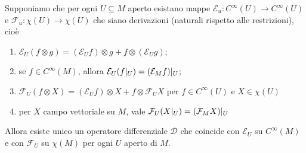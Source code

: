 \begin{theorem}
	Supponiamo che per ogni $U\subseteq M$ aperto esistano mappe $\mathcal E_u : C^\infty(U) \to C^\infty(U)$ e $\mathcal F_u : \chi(U) \to \chi(U)$ che siano derivazioni (naturali rispetto alle restrizioni), cioè
	\begin{enumerate}
		\item $\mathcal E_U(f\otimes g) = (\mathcal E_U f) \otimes g + f \otimes (\mathcal E_U g)$;
		\item se $f\in C^\infty(M)$, allora $\mathcal E_U(f|_ U) = (\mathcal E_M f)|_ U$;
		\item $\mathcal F_U(f\otimes X) = (\mathcal E_U f) \otimes X + f\otimes \mathcal F_U X$ per $f\in C^\infty(U)$ e $X\in\chi(U)$
		\item per $X$ campo vettoriale su $M$, vale $\mathcal F_U(X|_ U) = (\mathcal F_M X)|_ U$
	\end{enumerate}
	Allora esiste unico un operatore differenziale $\mathcal D$ che coincide con $\mathcal E_U$ su $C^\infty(M)$ e con $\mathcal F_U$ su $\chi(M)$ per ogni $U$ aperto di $M$.

\end{theorem}

